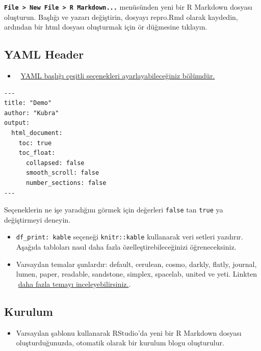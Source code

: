\documentclass[
  oneside]{book}
\providecommand{\tightlist}{%
  \setlength{\itemsep}{0pt}\setlength{\parskip}{0pt}}
\begin{document}
\begin{try}
\textbf{\texttt{File\ \textgreater{}\ New\ File\ \textgreater{}\ R\ Markdown...}} menüsünden yeni bir R Markdown dosyası oluşturun. Başlığı ve yazarı değiştirin, dosyayı repro.Rmd olarak kaydedin, ardından bir html dosyası oluşturmak için ör düğmesine tıklayın.

\end{try}

\hypertarget{yaml}{%
\subsection{YAML Header}\label{yaml}}

\begin{itemize}
\tightlist
\item
  🔗 \href{https://bookdown.org/yihui/rmarkdown/html-document.html}{YAML başlığı çeşitli seçenekleri ayarlayabileceğiniz bölümdür.}
\end{itemize}

\begin{verbatim}
---
title: "Demo"
author: "Kubra"
output:
  html_document:
    toc: true
    toc_float:
      collapsed: false
      smooth_scroll: false
      number_sections: false
---
\end{verbatim}

\begin{info}
Seçeneklerin ne işe yaradığını görmek için değerleri \texttt{false} tan \texttt{true} ya değiştirmeyi deneyin.

\end{info}

\begin{itemize}
\item
  \texttt{df\_print:\ kable} seçeneği \texttt{knitr::kable} kullanarak veri setleri yazdırır. Aşağıda tabloları nasıl daha fazla özelleştirebileceğinizi öğreneceksiniz.
\item
  Varsayılan temalar şunlardır: default, cerulean, cosmo, darkly, flatly, journal, lumen, paper, readable, sandstone, simplex, spacelab, united ve yeti. Linkten 🔗\href{https://rpubs.com/ranydc/rmarkdown_themes}{daha fazla temayı inceleyebilirsiniz.}.
\end{itemize}

\hypertarget{kurulum}{%
\subsection{Kurulum}\label{kurulum}}

\begin{itemize}
\tightlist
\item
  Varsayılan şablonu kullanarak RStudio'da yeni bir R Markdown dosyası oluşturduğunuzda, otomatik olarak bir kurulum blogu oluşturulur.
\end{itemize}
\end{document}
